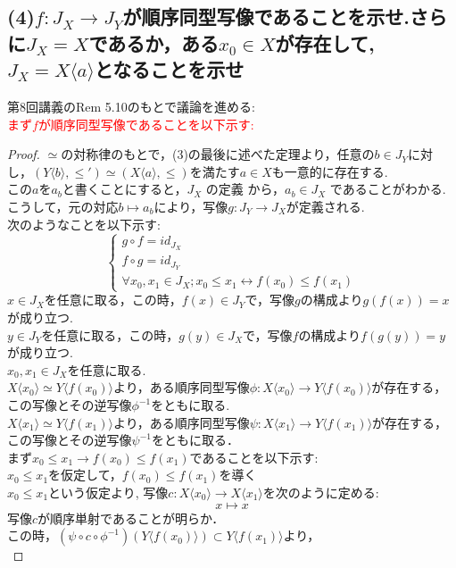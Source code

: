 \documentclass{jreport}
\begin{document}
\subsection{\normalsize{(4)$f: J_X \to J_Y $が順序同型写像であることを示せ.さらに$J_X =X$であるか，ある$x_0 \in X$が存在して,$J_X = X \langle a \rangle$となることを示せ}}
  第8回講義のRem 5.10のもとで議論を進める:\\
  \indent \textcolor{red}{まず$f$が順序同型写像であることを以下示す:}
  \begin{proof}
    $\simeq$の対称律のもとで，(3)の最後に述べた定理より，任意の$b \in J_Y$に対し，$(Y\langle b \rangle, \le ') \simeq (X \langle a \rangle , \le)$を満たす$a \in X$も一意的に存在する.\\
    この$a$を$a_b$と書くことにすると，$J_X$ の定義
    から，$a_b \in J_X$ であることがわかる. こうして，元の対応$b \mapsto a_b$により，写像$g:J_Y \to J_X$が定義される.\\
	次のようなことを以下示す:
	$$
	\begin{cases}
	  g \circ f = id_{J_X}\\
	  f \circ g = id_{J_Y}\\
	  \forall x_0,x_1 \in J_X ; x_0 \le x_1 \leftrightarrow f(x_0) \le f(x_1)
	\end{cases}
	$$
	$x \in J_X$を任意に取る，この時，$ f(x) \in J_Y $で，写像$g$の構成より$g(f(x))=x$が成り立つ.\\
	$y \in J_Y$を任意に取る，この時，$ g(y) \in J_X $で，写像$f$の構成より$f(g(y))=y$が成り立つ.\\
	$x_0 ,x_1 \in J_X$を任意に取る.\\
	$X \langle x_0 \rangle \simeq Y \langle f(x_0) \rangle$より，ある順序同型写像$\phi :X \langle x_0 \rangle \to Y \langle f(x_0) \rangle$が存在する，この写像とその逆写像$\phi^{-1}$をともに取る.\\
	$X \langle x_1 \rangle \simeq Y \langle f(x_1) \rangle$より，ある順序同型写像$\psi :X \langle x_1 \rangle \to Y \langle f(x_1) \rangle$が存在する，この写像とその逆写像$\psi^{-1}$をともに取る．\\
	まず$x_0 \le x_1 \rightarrow f(x_0) \le f(x_1)$であることを以下示す:\\
	$x_0 \le x_1$を仮定して，$ f(x_0) \le f(x_1)$を導く\\
	$x_0 \le x_1 $という仮定より,
	写像$c:X \langle x_0 \rangle \to X\langle x_1 \rangle$を次のように定める:\\
	$$x\mapsto x$$
	写像$c$が順序単射であることが明らか．\\
	この時，$(  \psi \circ c \circ \phi^{-1})(Y\langle f(x_0) \rangle) \subset Y \langle f(x_1) \rangle $より，\\

\end{proof}
\end{document}
